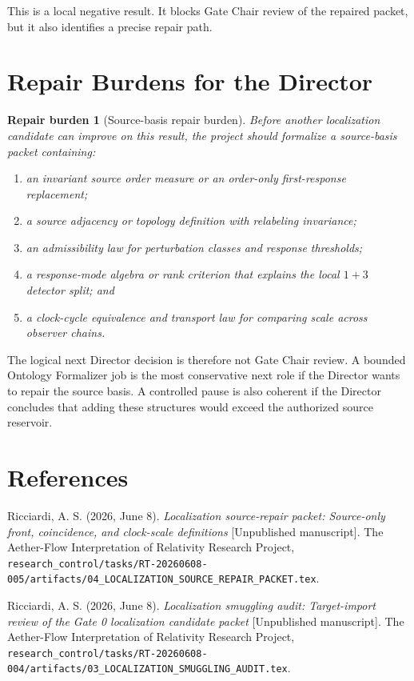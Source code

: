\documentclass[11pt]{article}
\newtheorem{repairburden}{Repair burden}
\begin{document}
This is a local negative result. It blocks Gate Chair review of the repaired
packet, but it also identifies a precise repair path.

\section{Repair Burdens for the Director}

\begin{repairburden}[Source-basis repair burden]
Before another localization candidate can improve on this result, the project
should formalize a source-basis packet containing:
\begin{enumerate}
    \item an invariant source order measure or an order-only first-response
    replacement;
    \item a source adjacency or topology definition with relabeling
    invariance;
    \item an admissibility law for perturbation classes and response
    thresholds;
    \item a response-mode algebra or rank criterion that explains the local
    \(1+3\) detector split; and
    \item a clock-cycle equivalence and transport law for comparing scale
    across observer chains.
\end{enumerate}
\end{repairburden}

The logical next Director decision is therefore not Gate Chair review. A
bounded Ontology Formalizer job is the most conservative next role if the
Director wants to repair the source basis. A controlled pause is also coherent
if the Director concludes that adding these structures would exceed the
authorized source reservoir.

\section*{References}

Ricciardi, A. S. (2026, June 8). \emph{Localization source-repair packet:
Source-only front, coincidence, and clock-scale definitions} [Unpublished
manuscript]. The Aether-Flow Interpretation of Relativity Research Project,
\texttt{research\_control/tasks/RT-20260608-005/artifacts/04\_LOCALIZATION\_SOURCE\_REPAIR\_PACKET.tex}.

Ricciardi, A. S. (2026, June 8). \emph{Localization smuggling audit:
Target-import review of the Gate 0 localization candidate packet}
[Unpublished manuscript]. The Aether-Flow Interpretation of Relativity
Research Project,
\texttt{research\_control/tasks/RT-20260608-004/artifacts/03\_LOCALIZATION\_SMUGGLING\_AUDIT.tex}.
\end{document}
